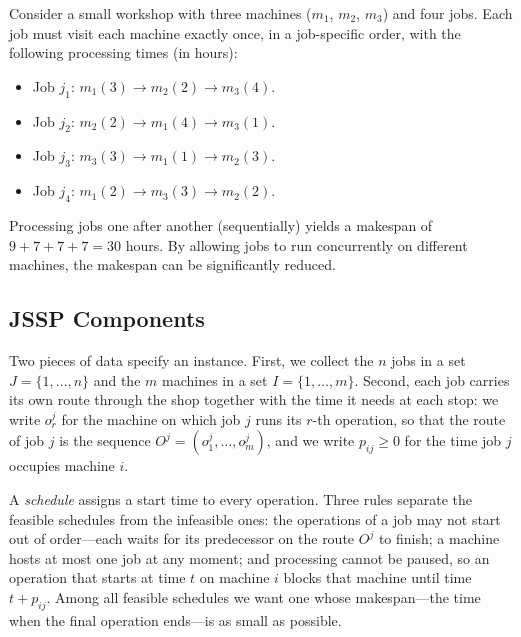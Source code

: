 Consider a small workshop with three machines ($m_1$, $m_2$, $m_3$) and four jobs.
Each job must visit each machine exactly once, in a job-specific order, with the following processing times (in hours):

\begin{itemize}
  \item Job $j_1$: $m_1(3) \to m_2(2) \to m_3(4)$.
  \item Job $j_2$: $m_2(2) \to m_1(4) \to m_3(1)$.
  \item Job $j_3$: $m_3(3) \to m_1(1) \to m_2(3)$.
  \item Job $j_4$: $m_1(2) \to m_3(3) \to m_2(2)$.
\end{itemize}

Processing jobs one after another (sequentially) yields a makespan of $9+7+7+7 = 30$ hours.
By allowing jobs to run concurrently on different machines, the makespan can be significantly reduced.

\subsection{JSSP Components}
Two pieces of data specify an instance.
First, we collect the $n$ jobs in a set $J = \{1, \ldots, n\}$ and the $m$ machines in a set $I = \{1, \ldots, m\}$.
Second, each job carries its own route through the shop together with the time it needs at each stop: we write $o_r^j$ for the machine on which job $j$ runs its $r$-th operation, so that the route of job $j$ is the sequence $O^j = (o_1^j, \ldots, o_m^j)$, and we write $p_{ij} \geq 0$ for the time job $j$ occupies machine $i$.

A \emph{schedule} assigns a start time to every operation.
Three rules separate the feasible schedules from the infeasible ones: the operations of a job may not start out of order---each waits for its predecessor on the route $O^j$ to finish; a machine hosts at most one job at any moment; and processing cannot be paused, so an operation that starts at time $t$ on machine $i$ blocks that machine until time $t + p_{ij}$.
Among all feasible schedules we want one whose makespan---the time when the final operation ends---is as small as possible.




